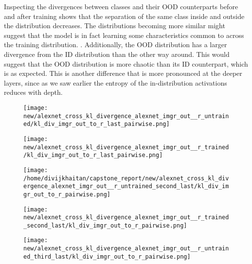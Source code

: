 \documentclass{article}
\begin{document}
            Inspecting the divergences between classes and their OOD counterparts before and after training shows that the separation of the same class inside and outside the distribution decreases. The distributions becoming more similar might suggest that the model is in fact learning some characteristics common to across the training distribution. . Additionally, the OOD distribution has a larger divergence from the ID distribution than the other way around. This would suggest that the OOD distribution is more chaotic than its ID counterpart, which is as expected. This is another difference that is more pronounced at the deeper layers, since as we saw earlier the entropy of the in-distribution activations reduces with depth. 
            
            \begin{figure}[H]
                \centering
                \begin{minipage}{0.45\textwidth}
                    \centering
                    \texttt{[image: new/alexnet\_cross\_kl\_divergence\_alexnet\_imgr\_out\_\_r\_untrained/kl\_div\_imgr\_out\_to\_r\_last\_pairwise.png]}
                    
                \end{minipage}\hfill
                \begin{minipage}{0.45\textwidth}
                    \centering
                    \texttt{[image: new/alexnet\_cross\_kl\_divergence\_alexnet\_imgr\_out\_\_r\_trained/kl\_div\_imgr\_out\_to\_r\_last\_pairwise.png]}
                \end{minipage}
                \begin{minipage}{0.45\textwidth}
                    \centering
                    \texttt{[image: /home/divijkhaitan/capstone\_report/new/alexnet\_cross\_kl\_divergence\_alexnet\_imgr\_out\_\_r\_untrained\_second\_last/kl\_div\_imgr\_out\_to\_r\_pairwise.png]}
                    
                \end{minipage}\hfill
                \begin{minipage}{0.45\textwidth}
                    \centering
                    \texttt{[image: new/alexnet\_cross\_kl\_divergence\_alexnet\_imgr\_out\_\_r\_trained\_second\_last/kl\_div\_imgr\_out\_to\_r\_pairwise.png]}
                \end{minipage}
                \begin{minipage}{0.45\textwidth}
                    \centering
                    \texttt{[image: new/alexnet\_cross\_kl\_divergence\_alexnet\_imgr\_out\_\_r\_untrained\_third\_last/kl\_div\_imgr\_out\_to\_r\_pairwise.png]}
                    

\end{minipage}
\end{figure}
\end{document}
